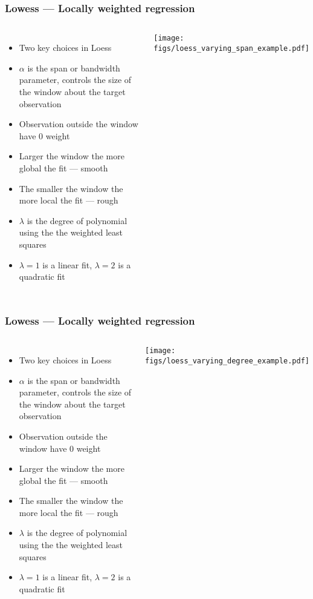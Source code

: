 \documentclass{beamer}
\begin{document}
\begin{frame}
    \frametitle{Lowess --- Locally weighted regression}
    \begin{columns}
        \column{6cm}
        \small
        \begin{itemize}
            \item Two key choices in Loess
            \item $\alpha$ is the span or bandwidth parameter, controls the size of the window about the target observation
            \item Observation outside the window have 0 weight
            \item Larger the window the more global the fit --- smooth
            \item The smaller the window the more local the fit --- rough
            \item $\lambda$ is the degree of polynomial using the the weighted least squares
            \item $\lambda = 1$ is a linear fit, $\lambda = 2$ is a quadratic fit
        \end{itemize}
        \normalsize
        \column{6cm}
        \texttt{[image: figs/loess\_varying\_span\_example.pdf]}
    \end{columns}
\end{frame}

\begin{frame}
    \frametitle{Lowess --- Locally weighted regression}
    \begin{columns}
        \column{6cm}
        \small
        \begin{itemize}
            \item Two key choices in Loess
            \item $\alpha$ is the span or bandwidth parameter, controls the size of the window about the target observation
            \item Observation outside the window have 0 weight
            \item Larger the window the more global the fit --- smooth
            \item The smaller the window the more local the fit --- rough
            \item $\lambda$ is the degree of polynomial using the the weighted least squares
            \item $\lambda = 1$ is a linear fit, $\lambda = 2$ is a quadratic fit
        \end{itemize}
        \normalsize
        \column{6cm}
        \texttt{[image: figs/loess\_varying\_degree\_example.pdf]}
    \end{columns}
\end{frame}
\end{document}
